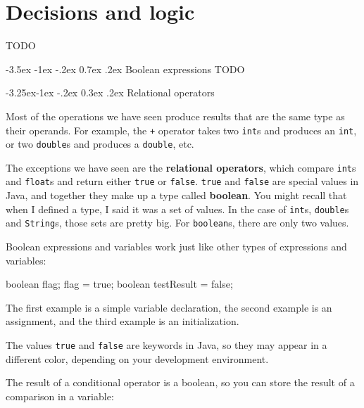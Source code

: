 \documentclass[12pt]{book}
\title{\thetitle}
\author{\theauthors}
\date{\theversion}
\makeatletter
\renewcommand{\section}{\@startsection {section}{1}{\z@}%
    {-3.5ex \@plus -1ex \@minus -.2ex}%
    {0.7ex \@plus.2ex}%
    {\normalfont\Large\bfseries}}
\renewcommand\subsection{\@startsection{subsection}{2}{\z@}%
    {-3.25ex\@plus -1ex \@minus -.2ex}%
    {0.3ex \@plus .2ex}%
    {\normalfont\large\bfseries}}
\theoremstyle{exercise}
\newcommand{\java}[1]{\lstinline{#1}} %
\makeatother
\begin{document}
\setcounter{chapter}{4}

\chapter{Decisions and logic}
TODO


\section{Boolean expressions}
TODO

\subsection{Relational operators}


Most of the operations we have seen produce results that are the same type as their operands.
For example, the \java{+} operator takes two \java{int}s and produces an \java{int}, or two \java{double}s and produces a \java{double}, etc.


The exceptions we have seen are the {\bf relational operators}, which compare {\tt int}s and {\tt float}s and return either {\tt true} or {\tt false}.
{\tt true} and {\tt false} are special values in Java, and together they make up a type called {\bf boolean}.
You might recall that when I defined a type, I said it was a set of values.
In the case of {\tt int}s, {\tt double}s and {\tt String}s, those sets are pretty big.
For {\tt boolean}s, there are only two values.

Boolean expressions and variables work just like other types of expressions and variables:

\begin{code}
    boolean flag;
    flag = true;
    boolean testResult = false;
\end{code}

The first example is a simple variable declaration, the second example is an assignment, and the third example is an initialization.

The values {\tt true} and {\tt false} are keywords in Java, so they may appear in a different color, depending on your development environment.


The result of a conditional operator is a boolean, so you can store the result of a comparison in a variable:
\end{document}
